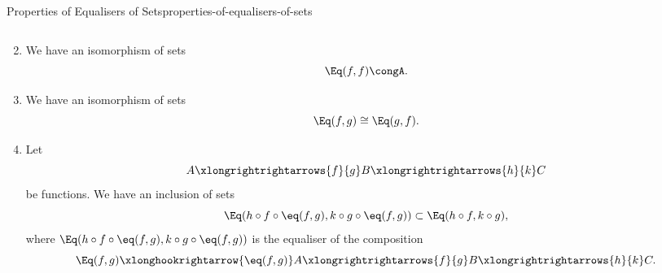 \begin{proposition}{Properties of Equalisers of Sets}{properties-of-equalisers-of-sets}
\begin{enumerate}
\[            \]%
        \item\label{properties-of-equalisers-of-sets-unitality}We have an isomorphism of sets
            \[
                \Eq(f,f)%
                \cong%
                A.%
            \]%
        \item\label{properties-of-equalisers-of-sets-commutativity}We have an isomorphism of sets
            \[
                \Eq(f,g)
                \cong
                \Eq(g,f).
            \]%
        \item\label{properties-of-equalisers-of-sets-interaction-with-composition}Let
            \[
                A
                \xlongrightrightarrows{f}{g}
                B
                \xlongrightrightarrows{h}{k}
                C
            \]%
            be functions. We have an inclusion of sets
            \[
                \Eq(h\circ f\circ\eq(f,g),k\circ g\circ\eq(f,g))
                \subset
                \Eq(h\circ f,k\circ g),
            \]%
            where $\Eq(h\circ f\circ\eq(f,g),k\circ g\circ\eq(f,g))$ is the equaliser of the composition
            \[
                \Eq(f,g)%
                \xlonghookrightarrow{\eq(f,g)}%
                A%
                \xlongrightrightarrows{f}{g}%
                B%
                \xlongrightrightarrows{h}{k}%
                C.%
            \]%
    \end{enumerate}
\end{proposition}

